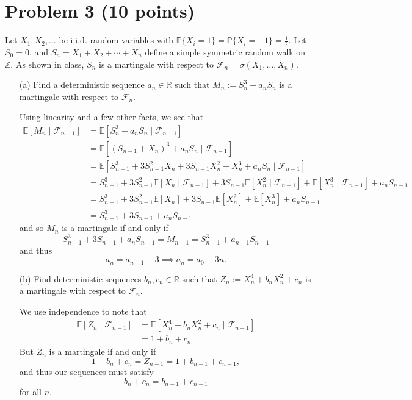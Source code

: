 \documentclass[11pt]{article}
\newcommand{\bbE}{\mathbb{E}}
\begin{document}
\newpage

\section*{Problem 3 (10 points)}
Let \(X_1, X_2, \ldots\) be i.i.d. random variables with \(\mathbb{P}\{X_i = 1\} = \mathbb{P}\{X_i = -1\} = \frac{1}{2}\). Let \(S_0 = 0\), and \(S_n = X_1 + X_2 + \cdots + X_n\) define a simple symmetric random walk on \(\mathbb{Z}\). As shown in class, \(S_n\) is a martingale with respect to \(\mathcal{F}_n = \sigma(X_1, \ldots, X_n)\).

\begin{itemize}
    \item[(a)] Find a deterministic sequence \(a_n \in \mathbb{R}\) such that \(M_n := S_n^3 + a_n S_n\) is a martingale with respect to \(\mathcal{F}_n\).
    \begin{solution}

Using linearity and a few other facts, we see that
\begin{align*}
    \bbE[M_n \mid \mathcal{F}_{n-1}] &= \bbE[S_{n}^3 + a_n S_n \mid \mathcal{F}_{n-1}]\\
    &= \bbE[(S_{n-1} + X_n)^3 + a_nS_{n} \mid \mathcal{F}_{n-1}]\\
    &= \bbE[S_{n-1}^3 + 3S_{n-1}^2 X_n + 3S_{n-1}X_n^2+X_n^3 + a_n S_{n} \mid \mathcal{F}_{n-1}]\\
    &= S^3_{n-1} + 3S^2_{n-1}\bbE[X_n \mid \mathcal{F}_{n-1}] + 3S_{n-1}\bbE[X_n^2 \mid \mathcal{F}_{n-1}] + \bbE[X_n^3 \mid \mathcal{F}_{n-1}] + a_n S_{n-1}\\
    &= S^3_{n-1} + 3S^2_{n-1}\bbE[X_n] + 3S_{n-1}\bbE[X_n^2 ] + \bbE[X_n^3 ] + a_n S_{n-1}\\
    &= S^3_{n-1} + 3S_{n-1} + a_nS_{n-1}
\end{align*}
and so $M_n$ is a martingale if and only if
\[S^3_{n-1} + 3S_{n-1} + a_nS_{n-1} = M_{n-1} = S_{n-1}^3 + a_{n-1}S_{n-1}\] and thus 
\[a_n = a_{n-1} - 3 \implies a_n = a_0 - 3n.\] 

    \end{solution}
    \item[(b)] Find deterministic sequences \(b_n, c_n \in \mathbb{R}\) such that \(Z_n := X_n^4 + b_n X_n^2 + c_n\) is a martingale with respect to \(\mathcal{F}_n\).
\begin{solution}
    We use independence to note that 
    \begin{align*}
        \bbE[Z_n \mid \mathcal{F}_{n-1}] &= \bbE[X_n^4 + b_nX_n^2 + c_n \mid \mathcal{F}_{n-1}]\\
        &= 1 + b_n + c_n
    \end{align*}
    But $Z_n$ is a martingale if and only if 
    \[1 + b_n + c_n = Z_{n-1} = 1 + b_{n-1} + c_{n-1},\] and thus our sequences must satisfy 
    \[b_n + c_n = b_{n-1} + c_{n-1}\] for all $n.$
\end{solution}
\end{itemize}
\end{document}

